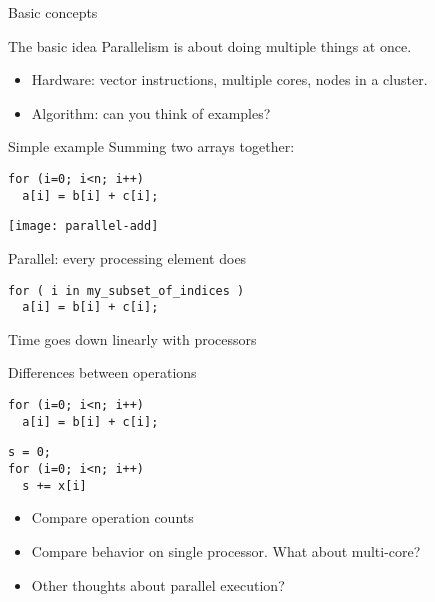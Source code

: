 
 {Basic concepts}

\begin{numberedframe}{The basic idea}
  Parallelism is about doing multiple things at once.
  \begin{itemize}
  \item Hardware: vector instructions, multiple cores, nodes in a cluster.
  \item Algorithm: can you think of examples?
  \end{itemize}
\end{numberedframe}

\begin{numberedframe}{Simple example}
Summing two arrays together:
\begin{lstlisting}
for (i=0; i<n; i++)
  a[i] = b[i] + c[i];
\end{lstlisting}
  \texttt{[image: parallel-add]}

Parallel: every processing element does
\begin{lstlisting}
for ( i in my_subset_of_indices )
  a[i] = b[i] + c[i];
\end{lstlisting}
  Time goes down linearly with processors
\end{numberedframe}

\begin{numberedframe}{Differences between operations}
\begin{multicols}{2}
\begin{lstlisting}
for (i=0; i<n; i++)
  a[i] = b[i] + c[i];
\end{lstlisting}
\columnbreak
\begin{lstlisting}
s = 0;
for (i=0; i<n; i++)
  s += x[i]
\end{lstlisting}
\end{multicols}
  \begin{itemize}
  \item Compare operation counts
  \item Compare behavior on single processor. What about multi-core?
  \item Other thoughts about parallel execution?
  \end{itemize}
\end{numberedframe}

